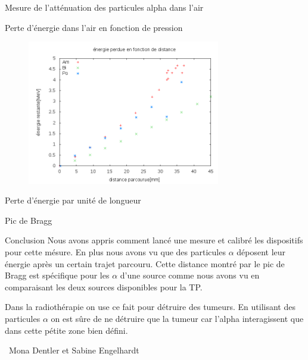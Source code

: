 \documentclass[a4paper,11pt]{scrartcl}
\begin{document}
\begin{section}{Mesure de l'atténuation des particules alpha dans l'air}
\begin{subsection}{Perte d'énergie dans l'air en fonction de pression}
\begin{figure}[h]
\begin{center}
    \end{center}
   \end{figure}
   \begin{figure}[h]
    \begin{center}
     \includegraphics[width=0.75\textwidth]{Bilder/energie_perdue.png}
    \end{center}
   \end{figure}
  \end{subsection}
  
  \begin{subsection}{Perte d'énergie par unité de longueur}
  \end{subsection}
 \end{section}

 \begin{section}{Pic de Bragg}
  
 \end{section}

 
 \begin{section}{Conclusion}
  Nous avons appris comment lancé une mesure et calibré les dispositifs pour cette mésure. En plus nous avons vu que des particules $\alpha$ déposent leur énergie après un certain trajet parcouru. Cette distance montré par le pic de Bragg est spécifique pour les $\alpha$ d'une source comme nous avons vu en comparaisant les deux sources disponibles pour la TP.
  
  Dans la radiothérapie on use ce fait pour détruire des tumeurs. En utilisant des particules $\alpha$ on est sûre de ne détruire que la tumeur car l'alpha interagissent que dans cette pétite zone bien défini.
 \end{section}

 \vspace{1cm}
 \begin{flushright}
  \titlefont \textcopyleft\ Mona Dentler et Sabine Engelhardt
 \end{flushright}
\end{document}
